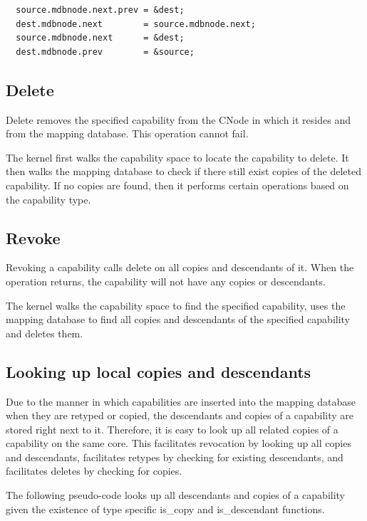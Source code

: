 \documentclass[a4paper,twoside]{report} %
\begin{document}
{\scriptsize
\begin{verbatim}
  source.mdbnode.next.prev = &dest;
  dest.mdbnode.next        = source.mdbnode.next;
  source.mdbnode.next      = &dest;
  dest.mdbnode.prev        = &source;
\end{verbatim}
}

\subsection{Delete}
Delete removes the specified capability from the CNode in which it
resides and from the mapping database. This operation cannot fail.

The kernel first walks the capability space to locate the capability
to delete. It then walks the mapping database to check if there still
exist copies of the deleted capability. If no copies are found, then
it performs certain operations based on the capability type.

\subsection{Revoke}
Revoking a capability calls delete on all copies and descendants of
it. When the operation returns, the capability will not have any
copies or descendants.

The kernel walks the capability space to find the specified
capability, uses the mapping database to find all copies and
descendants of the specified capability and deletes them.

\subsection{Looking up local copies and descendants}
Due to the manner in which capabilities are inserted into the mapping
database when they are retyped or copied, the descendants and copies
of a capability are stored right next to it. Therefore, it is easy to
look up all related copies of a capability on the same core. This
facilitates revocation by looking up all copies and descendants,
facilitates retypes by checking for existing descendants, and
facilitates deletes by checking for copies.

The following pseudo-code looks up all descendants and copies of a
capability given the existence of type specific is\_copy and
is\_descendant functions.
\end{document}
